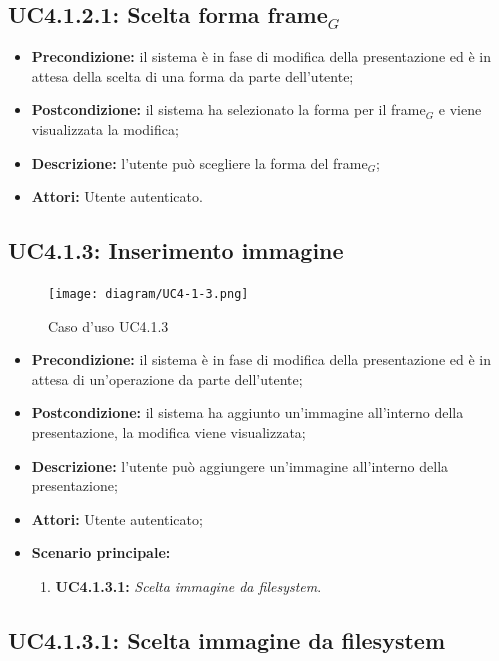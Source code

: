\subsection{ UC4.1.2.1: Scelta forma frame$_G$}

\begin{itemize}
	\item \textbf{Precondizione:} il sistema è in fase di modifica della presentazione ed è in attesa della scelta di una forma da parte dell'utente;
	\item \textbf{Postcondizione:} il sistema ha selezionato la forma per il frame$_G$ e viene visualizzata la modifica;
	\item \textbf{Descrizione:} l'utente può scegliere la forma del frame$_G$;
	\item \textbf{Attori:} Utente autenticato.
\end{itemize}
\subsection{ UC4.1.3: Inserimento immagine}

\begin{figure}[h]
	\begin{center}
	\texttt{[image: diagram/UC4-1-3.png]}
	\caption{Caso d'uso UC4.1.3}
	\end{center}
\end{figure}
\begin{itemize}
	\item \textbf{Precondizione:} il sistema è in fase di modifica della presentazione ed è in attesa di un'operazione da parte dell'utente;
	\item \textbf{Postcondizione:} il sistema ha aggiunto un'immagine all'interno della presentazione, la modifica viene visualizzata;
	\item \textbf{Descrizione:} l'utente può aggiungere un'immagine all'interno della presentazione;
	\item \textbf{Attori:} Utente autenticato;
	\item \textbf{Scenario principale:}
	\begin{enumerate}
		\item \textbf{ UC4.1.3.1:} \textit{ Scelta immagine da filesystem}.
	\end{enumerate}
\end{itemize}
\subsection{ UC4.1.3.1: Scelta immagine da filesystem}

